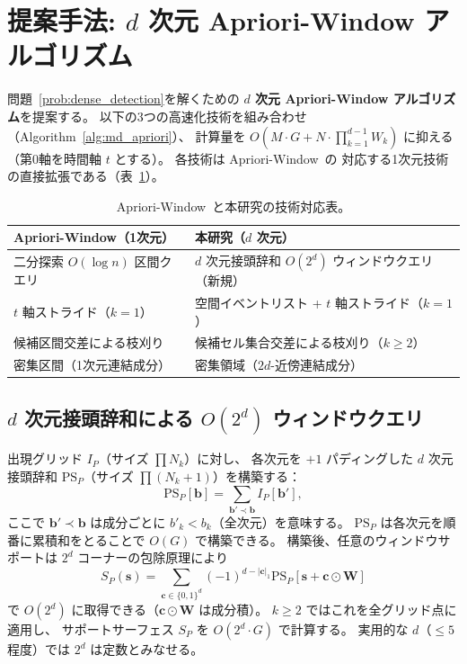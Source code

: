 \section{提案手法: $d$ 次元 Apriori-Window アルゴリズム}
\label{sec:method}

問題~\ref{prob:dense_detection}を解くための
\textbf{$d$ 次元 Apriori-Window アルゴリズム}を提案する。
以下の3つの高速化技術を組み合わせ（Algorithm~\ref{alg:md_apriori}）、
計算量を
$O\!\left(M \cdot G + N \cdot \prod_{k=1}^{d-1} W_k\right)$ に抑える
（第0軸を時間軸 $t$ とする）。
各技術は Apriori-Window~\cite{aprioriwindow}の
対応する1次元技術の直接拡張である（表~\ref{tab:correspondence}）。

\begin{table}[t]
\centering
\caption{Apriori-Window~\cite{aprioriwindow}と本研究の技術対応表。}
\label{tab:correspondence}
\small
\begin{tabular}{ll}
\toprule
Apriori-Window（1次元）& 本研究（$d$ 次元）\\
\midrule
二分探索 $O(\log n)$ 区間クエリ & $d$ 次元接頭辞和 $O(2^d)$ ウィンドウクエリ（新規）\\
$t$ 軸ストライド（$k=1$） & 空間イベントリスト + $t$ 軸ストライド（$k=1$）\\
候補区間交差による枝刈り & 候補セル集合交差による枝刈り（$k\geq2$）\\
密集区間（1次元連結成分） & 密集領域（$2d$-近傍連結成分）\\
\bottomrule
\end{tabular}
\end{table}

\subsection{$d$ 次元接頭辞和による $O(2^d)$ ウィンドウクエリ}\label{sec:prefix_sum}

出現グリッド $I_P$（サイズ $\prod N_k$）に対し、
各次元を $+1$ パディングした $d$ 次元接頭辞和 $\mathrm{PS}_P$（サイズ $\prod (N_k+1)$）を構築する：
\begin{equation}\label{eq:prefix_sum}
  \mathrm{PS}_P[\bm{b}]
  = \sum_{\bm{b}' \prec \bm{b}} I_P[\bm{b}'],
\end{equation}
ここで $\bm{b}' \prec \bm{b}$ は成分ごとに $b'_k < b_k$（全次元）を意味する。
$\mathrm{PS}_P$ は各次元を順番に累積和をとることで $O(G)$ で構築できる。
構築後、任意のウィンドウサポートは $2^d$ コーナーの包除原理により
\begin{equation}\label{eq:query}
  S_P(\bm{s})
  = \sum_{\bm{c} \in \{0,1\}^d}
    (-1)^{d - |\bm{c}|_1}
    \mathrm{PS}_P[\bm{s} + \bm{c} \odot \bm{W}]
\end{equation}
で $O(2^d)$ に取得できる（$\bm{c} \odot \bm{W}$ は成分積）。
$k \geq 2$ ではこれを全グリッド点に適用し、
サポートサーフェス $S_P$ を $O(2^d \cdot G)$ で計算する。
実用的な $d$（$\leq 5$ 程度）では $2^d$ は定数とみなせる。

